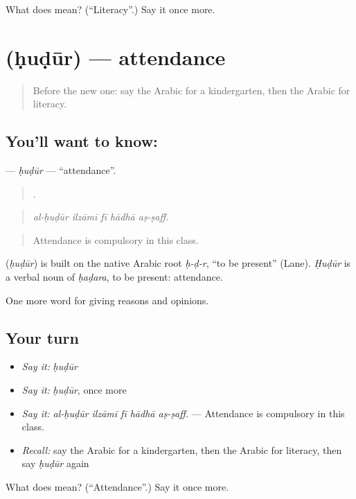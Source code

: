 \begin{tcolorbox}[breakable,colback=teal!4,colframe=teal!35!black,title={Before you move on}]
What does   mean? (\textquotedblleft{}Literacy\textquotedblright{}.) Say it once more.
\end{tcolorbox}
\section[\texorpdfstring{\ar{حضور} (ḥuḍūr)}{حضور (ḥuḍūr)}]{ (ḥuḍūr) — attendance}

\label{lesson:AR-C398-hudur}



\begin{quote}
Before the new one: say the Arabic for a kindergarten, then the Arabic for literacy.
\end{quote}

\subsection*{You'll want to know: }
\textbf{} — \emph{ḥuḍūr} — \textquotedblleft{}attendance\textquotedblright{}.

\begin{quote}
    .
\end{quote}

\begin{quote}
\emph{al-ḥuḍūr ilzāmī fī hādhā aṣ-ṣaff.}
\end{quote}

\begin{quote}
Attendance is compulsory in this class.
\end{quote}

\begin{cousinweb}
\textbf{} (\emph{ḥuḍūr}) is built on the native Arabic root \emph{ḥ-ḍ-r}, \textquotedblleft{}to be present\textquotedblright{} (Lane). \emph{Ḥuḍūr} is a verbal noun of \emph{ḥaḍara}, to be present: attendance.
\end{cousinweb}

\begin{grammarlens}[title={What you've built}]
One more word for giving reasons and opinions.
\end{grammarlens}

\subsection*{Your turn}
\begin{itemize}
\raggedright
  \item \emph{Say it:} \emph{ḥuḍūr}
  \item \emph{Say it:} \emph{ḥuḍūr}, once more
  \item \emph{Say it:} \emph{al-ḥuḍūr ilzāmī fī hādhā aṣ-ṣaff.} — Attendance is compulsory in this class.
  \item \emph{Recall:} say the Arabic for a kindergarten, then the Arabic for literacy, then say \emph{ḥuḍūr} again
\end{itemize}

\begin{tcolorbox}[breakable,colback=teal!4,colframe=teal!35!black,title={Before you move on}]
What does  mean? (\textquotedblleft{}Attendance\textquotedblright{}.) Say it once more.
\end{tcolorbox}
